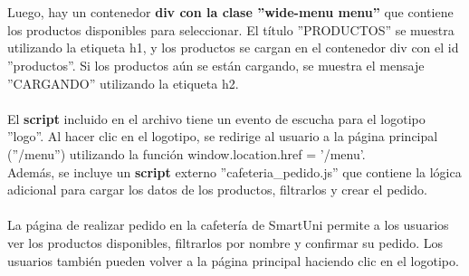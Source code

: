 \documentclass[12pt]{report}
\begin{document}
\\\\Luego, hay un contenedor \textbf{div con la clase ''wide-menu menu''} que contiene los productos disponibles para seleccionar. El título ''PRODUCTOS'' se muestra utilizando la etiqueta h1, y los productos se cargan en el contenedor div con el id ''productos''. Si los productos aún se están cargando, se muestra el mensaje ''CARGANDO'' utilizando la etiqueta h2.
\\\\
El \textbf{script}  incluido en el archivo tiene un evento de escucha para el logotipo ''logo''. Al hacer clic en el logotipo, se redirige al usuario a la página principal (''/menu'') utilizando la función window.location.href = '/menu'.
\\Además, se incluye un \textbf{script} externo ''cafeteria\_pedido.js'' que contiene la lógica adicional para cargar los datos de los productos, filtrarlos y crear el pedido.
\\\\La página de realizar pedido en la cafetería de SmartUni permite a los usuarios ver los productos disponibles, filtrarlos por nombre y confirmar su pedido. Los usuarios también pueden volver a la página principal haciendo clic en el logotipo.
\end{document}
